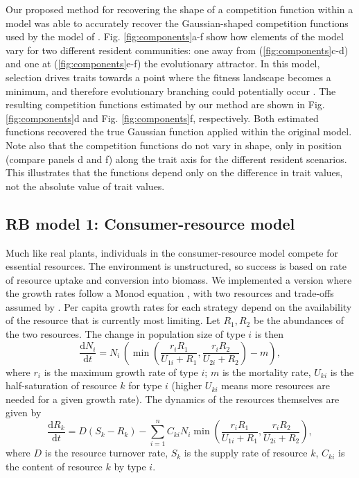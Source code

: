 \documentclass[a4paper,11pt]{article}
\newcommand{\ud}{\ensuremath{\mathrm{d}}}
\begin{document}
Our proposed method for recovering the shape of a competition function within a model was able to accurately recover the Gaussian-shaped competition functions used by the model of \citet{Dieckmann-1999}. Fig. \ref{fig:components}a-f show how elements of the model vary for two different resident communities: one away from (\ref{fig:components}c-d) and one at (\ref{fig:components}e-f) the evolutionary attractor. In this model, selection drives traits towards a point where the fitness landscape becomes a minimum, and therefore evolutionary branching could potentially occur \citet{Dieckmann-1999}. The resulting competition functions estimated by our method are shown in Fig. \ref{fig:components}d and Fig. \ref{fig:components}f, respectively. Both estimated functions recovered the true Gaussian function applied within the original model. Note also that the competition functions do not vary in shape, only in position (compare panels d and f) along the trait axis for the different resident scenarios. This illustrates that the functions depend only on the difference in trait values, not the absolute value of trait values.

\subsection{RB model 1: Consumer-resource model}

Much like real plants, individuals in the consumer-resource model compete for essential resources. The environment is unstructured, so success is based on rate of resource uptake and conversion into biomass. We implemented a version where the growth rates follow a Monod equation \citep{Huisman-2001}, with two resources and trade-offs assumed by \citet{Fox-2008}. Per capita growth rates for each strategy depend on the availability of the resource that is currently most limiting. Let $R_1, R_2$ be the abundances of the two resources. The change in population size of type $i$ is then
\begin{equation}
 \label{eq:rstar-n}
 \frac{\ud N_i}{\ud t} = N_i \, \left(\min\left(\frac{r_i R_1}{U_{1i} + R_1}, \frac{r_i R_2}{U_{2i} + R_2}\right) - m\right),
\end{equation}
where $r_i$ is the maximum growth rate of type $i$; $m$ is the mortality rate, $U_{ki}$ is the half-saturation of resource $k$ for type $i$ (higher $U_{ki}$ means more resources are needed for a given growth rate). The dynamics of the resources themselves are given by
\begin{equation}
 \label{eq:rstar-r}
 \frac{\ud R_k}{\ud t} =
 D (S_k - R_k) - \sum_{i=1}^n {C_{ki} N_i
 \min\left(\frac{r_i R_1}{U_{1i} + R_1}, \frac{r_i R_2}{U_{2i} + R_2}\right)},
\end{equation}
where $D$ is the resource turnover rate, $S_k$ is the supply rate of resource $k$, 
$C_{ki}$ is the content of resource $k$ by type $i$.
\end{document}
